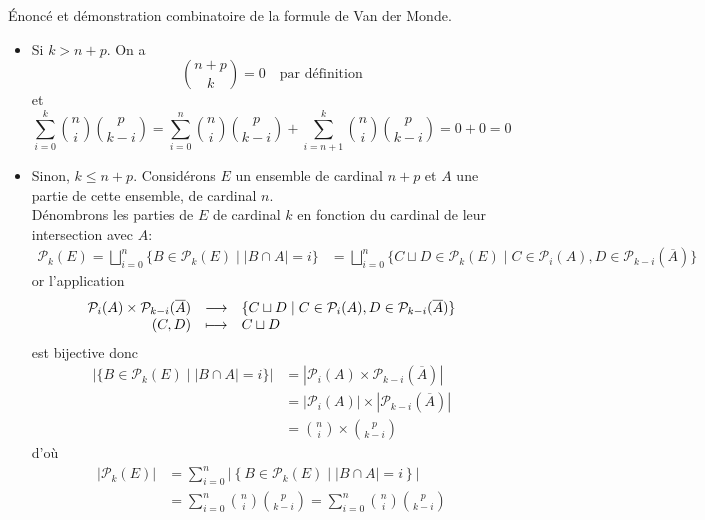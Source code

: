 \documentclass{article}
\renewenvironment{question_kholle}[2][ ]
{
	\subsection{\texorpdfstring{#2}{}}
	\notblank{#1}
	{
		\noindent #1
		\bigbreak
	}
	{}
	\begin{proof}
}
{
	\end{proof}
}
\begin{document}
\begin{question_kholle}{Énoncé et démonstration combinatoire de la formule de Van der Monde.}
	\begin{itemize}
		\item Si $k>n+p$. On a
		      \[
			      \binom{n+p}{k}=0 \quad\text{par définition}
		      \]
		      et
		      \[
			      \sum_{i=0}^{k}\binom{n}{i}\binom{p}{k-i} = \sum_{i=0}^{n}\binom{n}{i}\binom{p}{k-i} + \sum_{i=n+1}^{k}\binom{n}{i}\binom{p}{k-i} = 0+0 = 0
		      \]
		\item  Sinon, $k\leq n+p$. Considérons $E$ un ensemble de cardinal $n+p$ et $A$ une partie de cette ensemble, de cardinal $n$.\\
		      Dénombrons les parties de $E$ de cardinal $k$ en fonction du cardinal de leur intersection avec $A$:
		      \begin{align*}
			      \mathcal{P}_{k}(E)=\bigsqcup_{i=0}^{n}\{B\in \mathcal{P}_{k}(E) \mid |B\cap A| = i\}
			       & = \bigsqcup_{i=0}^{n}\{C\sqcup D\in \mathcal{P}_{k}(E) \mid C\in \mathcal{P}_{i}(A), D\in \mathcal{P}_{k-i}(\overline{A})\}
		      \end{align*}
		      or l’application
		      \[
			      \begin{array}{rcl} \mathcal{P}_{i}(A)\times \mathcal{P}_{k-i}(\overline{A}) & \longrightarrow & \{C\sqcup D \mid C\in \mathcal{P}_{i}(A), D\in\mathcal{P}_{k-i}(\overline{A})\} \\ (C,D) & \longmapsto & C\sqcup D \end{array}
		      \]
		      est bijective donc
		      \begin{align*}
			      |\{B\in\mathcal{P}_{k}(E) \mid |B\cap A| = i\}| & = |\mathcal{P}_{i}(A) \times \mathcal{P}_{k-i}(\overline{A})|   \\
			                                                      & = |\mathcal{P}_{i}(A)| \times |\mathcal{P}_{k-i}(\overline{A})| \\
			                                                      & = \binom{n}{i} \times \binom{p}{k-i}
		      \end{align*}
		      d’où
		      \begin{align*}
			      |\mathcal{P}_{k}(E)| & = \sum_{i=0}^{n}\left|\left\{B\in \mathcal{P}_{k}(E)\mid |B\cap A|=i\right\}\right|   \\
			                           & = \sum_{i=0}^{n}\binom{n}{i}\binom{p}{k-i} = \sum_{i=0}^{n}\binom{n}{i}\binom{p}{k-i}
		      \end{align*}
	\end{itemize}

\end{question_kholle}
\end{document}
